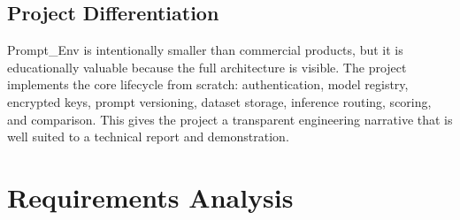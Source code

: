 \documentclass[12pt,a4paper]{report}
\newcommand{\ProjectName}{Prompt\_Env}
\begin{document}
\section{Project Differentiation}
\ProjectName{} is intentionally smaller than commercial products, but it is educationally valuable because the full architecture is visible. The project implements the core lifecycle from scratch: authentication, model registry, encrypted keys, prompt versioning, dataset storage, inference routing, scoring, and comparison. This gives the project a transparent engineering narrative that is well suited to a technical report and demonstration.

\chapter{Requirements Analysis}
\end{document}
